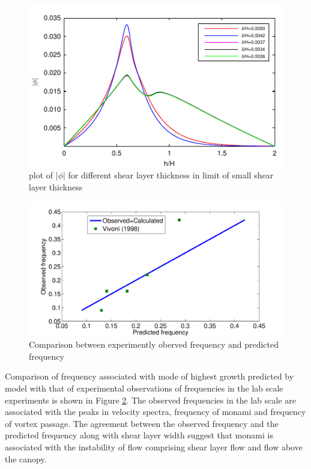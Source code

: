 \documentclass[aps,prl,twocolumn,showpacs,superscriptaddress,groupedaddress,10pt]{revtex4-1}  %
\begin{document}
\begin{figure}[]
\includegraphics[]{Asymptotic_eig_set3.pdf}
\caption{plot of $|\phi|$ for different shear layer thickness in limit of small shear layer thickness}
\label{Asymptotic_mode}
\end{figure}
\begin{figure}[htb]
\includegraphics[scale=0.34]{Observed_vs_calculated}
\caption{Comparison between experimently oberved frequency and predicted frequency}
\label{Observed_calculated}
\end{figure}
\newline
Comparison of frequency associated with mode of highest growth predicted by model with that of experimental observations of frequencies in the lab scale experiments is shown in
Figure \ref{Observed_calculated}.
The observed frequencies in the lab scale are associated with the peaks in velocity spectra, frequency of monami and frequency of vortex passage. The agreement between the observed
frequency and the predicted frequency along with shear layer width suggest that monami is associated with the instability of flow comprising shear layer flow and flow above the canopy.
\end{document}
